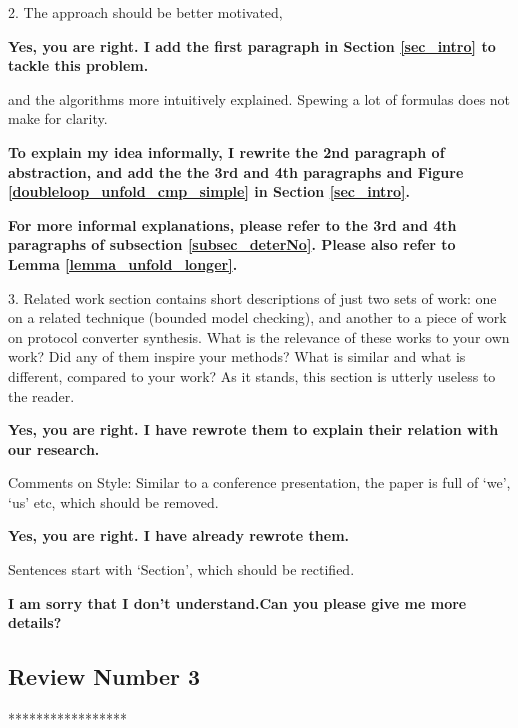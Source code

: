 \documentclass[journal]{IEEEtran}
\begin{document}
\bigskip




2. The approach should be better motivated,

\smallskip

\textbf{Yes,
you are right.
I add the first paragraph in Section \ref{sec_intro} to tackle this problem.}

\bigskip


and the algorithms more intuitively explained. Spewing a lot of formulas does not make for clarity.

\smallskip

\textbf{To explain my idea informally,
I rewrite the 2nd paragraph of abstraction,
and add the the 3rd and 4th paragraphs and Figure \ref{doubleloop_unfold_cmp_simple} in Section \ref{sec_intro}.
}

\textbf{For more informal explanations,
please refer to the 3rd and 4th paragraphs of subsection \ref{subsec_deterNo}.
Please also refer to Lemma \ref{lemma_unfold_longer}. }

\bigskip

3. Related work section contains short descriptions of just two sets of work: one on a related technique (bounded model checking),
and another to a piece of work on protocol converter synthesis.
What is the relevance of these works to your own work?
Did any of them inspire your methods? What is similar and what is different,
compared to your work? As it stands, this section is utterly useless to the reader.

\smallskip

\textbf{Yes,
you are right.
I have rewrote them to explain their relation with our research.
}

\bigskip


Comments on Style:
Similar to a conference presentation, the paper is full of `we', `us' etc, which should be removed.

\smallskip

\textbf{Yes,
you are right.
I have already rewrote them.}

\bigskip

Sentences start with `Section', which should be rectified.

\smallskip

\textbf{I am sorry that
I don't understand.Can you please give me more details?}

\bigskip


\subsection{Review Number 3}
*****************
\end{document}
